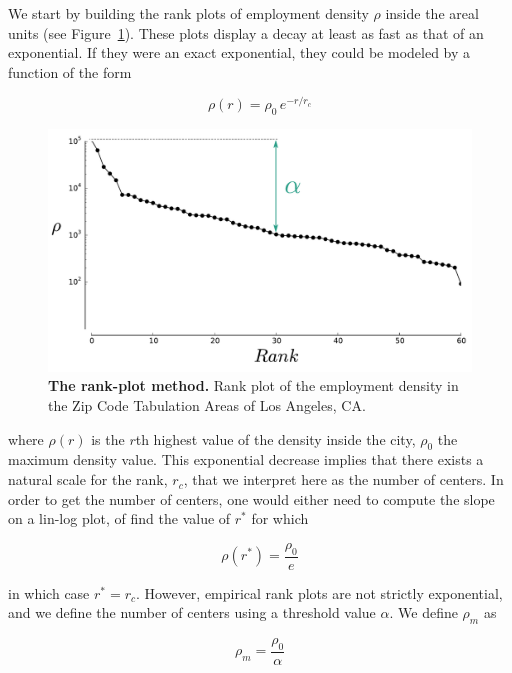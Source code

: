 We start by building the rank plots of employment density $\rho$ inside the
areal units (see Figure~\ref{fig:rank_plot}). These plots display a decay at least as fast as that of an
exponential. If they were an exact exponential, they could be modeled by a
function of the form

\begin{equation}
    \rho(r) = \rho_0\,e^{-r/r_c}
    \label{eq:}
\end{equation}

\begin{figure}
    \centering
    \includegraphics[width=1\textwidth]{gfx/chapter-monocentric/rank_plot_LA.pdf}
    \caption{{\bf The rank-plot method.} Rank plot of the employment density in
        the Zip Code Tabulation Areas of Los Angeles, CA.
    \label{fig:rank_plot}}
\end{figure}

where $\rho(r)$ is the $r$th highest value of the density inside the city,
$\rho_0$ the maximum density value. This exponential decrease implies that there
exists a natural scale for the rank, $r_c$, that we interpret here as the number
of centers. In order to get the number of centers, one would either need to
compute the slope on a lin-log plot, of find the value of $r^*$ for which

\begin{equation}
    \rho(r^*) = \frac{\rho_0}{e} 
\end{equation}

in which case $r^*=r_c$. However, empirical rank plots are not strictly exponential,
and we define the number of centers using a threshold value $\alpha$. We define
$\rho_m$ as 

\begin{equation}
    \rho_m = \frac{\rho_0}{\alpha}
\end{equation}

